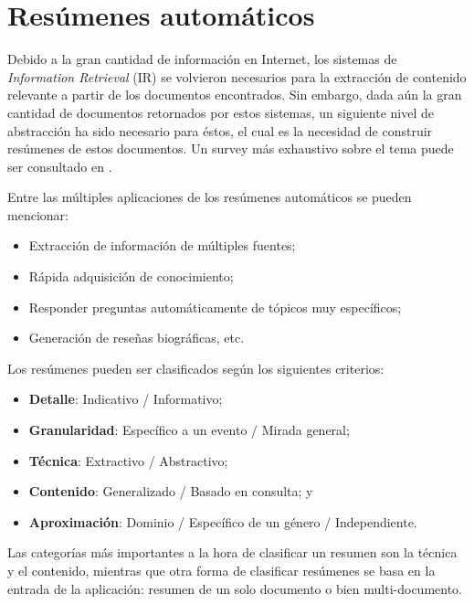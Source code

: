 \vspace*{\fill}

\section{Resúmenes automáticos}
\label{sec-2.4}


   Debido a la gran cantidad de información en Internet, los sistemas
   de \emph{Information Retrieval} (IR) se volvieron necesarios para la
   extracción de contenido relevante a partir de los documentos
   encontrados. Sin embargo, dada aún la gran cantidad de documentos
   retornados por estos sistemas, un siguiente nivel de abstracción ha
   sido necesario para éstos, el cual es la necesidad de construir
   resúmenes de estos documentos\cite{Ganapathiraju_relevanceof}. Un
   survey más exhaustivo sobre el tema puede ser consultado en
   \cite{Das07asurvey}.

   Entre las múltiples aplicaciones de los resúmenes automáticos se
   pueden mencionar:
\begin{itemize}
\item Extracción de información de múltiples fuentes;
\item Rápida adquisición de conocimiento;
\item Responder preguntas automáticamente de tópicos muy específicos;
\item Generación de reseñas biográficas, etc.
\end{itemize}
   Los resúmenes pueden ser clasificados según los siguientes
   criterios:

\begin{itemize}
\item \textbf{Detalle}: Indicativo / Informativo;
\item \textbf{Granularidad}: Específico a un evento / Mirada general;
\item \textbf{Técnica}: Extractivo / Abstractivo;
\item \textbf{Contenido}: Generalizado / Basado en consulta; y
\item \textbf{Aproximación}: Dominio / Específico de un género /
     Independiente.
\end{itemize}
   Las categorías más importantes a la hora de clasificar un resumen
   son la técnica y el contenido, mientras que otra forma de
   clasificar resúmenes se basa en la entrada de la aplicación:
   resumen de un solo documento o bien multi-documento.

